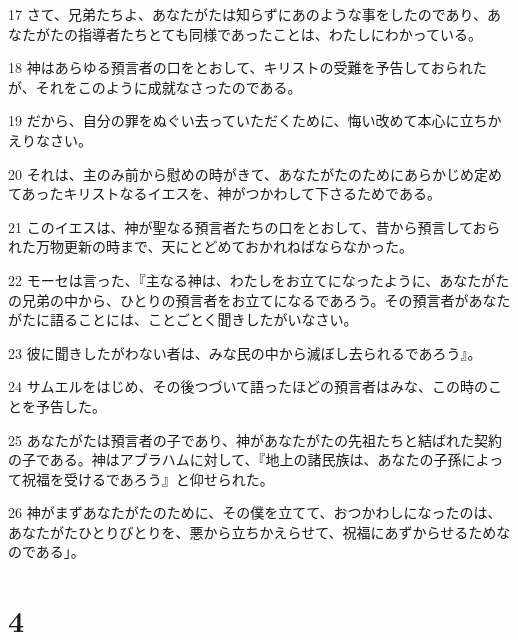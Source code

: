 \par 17 さて、兄弟たちよ、あなたがたは知らずにあのような事をしたのであり、あなたがたの指導者たちとても同様であったことは、わたしにわかっている。
\par 18 神はあらゆる預言者の口をとおして、キリストの受難を予告しておられたが、それをこのように成就なさったのである。
\par 19 だから、自分の罪をぬぐい去っていただくために、悔い改めて本心に立ちかえりなさい。
\par 20 それは、主のみ前から慰めの時がきて、あなたがたのためにあらかじめ定めてあったキリストなるイエスを、神がつかわして下さるためである。
\par 21 このイエスは、神が聖なる預言者たちの口をとおして、昔から預言しておられた万物更新の時まで、天にとどめておかれねばならなかった。
\par 22 モーセは言った、『主なる神は、わたしをお立てになったように、あなたがたの兄弟の中から、ひとりの預言者をお立てになるであろう。その預言者があなたがたに語ることには、ことごとく聞きしたがいなさい。
\par 23 彼に聞きしたがわない者は、みな民の中から滅ぼし去られるであろう』。
\par 24 サムエルをはじめ、その後つづいて語ったほどの預言者はみな、この時のことを予告した。
\par 25 あなたがたは預言者の子であり、神があなたがたの先祖たちと結ばれた契約の子である。神はアブラハムに対して、『地上の諸民族は、あなたの子孫によって祝福を受けるであろう』と仰せられた。
\par 26 神がまずあなたがたのために、その僕を立てて、おつかわしになったのは、あなたがたひとりびとりを、悪から立ちかえらせて、祝福にあずからせるためなのである」。

\chapter{4}

